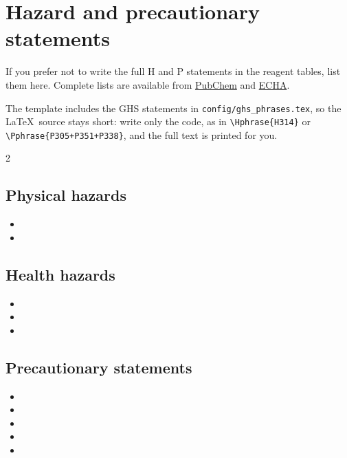 \section*{Hazard and precautionary statements}

If you prefer not to write the full H and P statements in the reagent tables, list them here. Complete lists are available from \href{https://pubchem.ncbi.nlm.nih.gov/ghs/}{PubChem} and \href{https://echa.europa.eu/regulations/clp/labelling}{ECHA}.

The template includes the GHS statements in \texttt{config/ghs\_phrases.tex}, so the \LaTeX\ source stays short: write only the code, as in \verb|\Hphrase{H314}| or \verb|\Pphrase{P305+P351+P338}|, and the full text is printed for you.

\begingroup
\small
\begin{multicols}{2}
    \subsection*{Physical hazards}
    \begin{itemize}
        \item {}
        \item {}
    \end{itemize}
    \subsection*{Health hazards}
    \begin{itemize}
        \item {}
        \item {}
        \item {}
    \end{itemize}
    \subsection*{Precautionary statements}
    \begin{itemize}
        \item {}
        \item {}
        \item {}
        \item {}
        \item {}
    \end{itemize}
\end{multicols}
\endgroup

